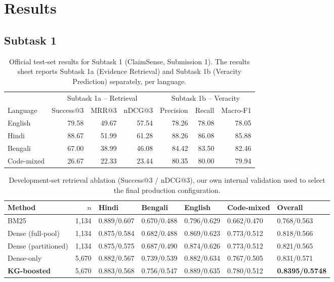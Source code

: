 \documentclass[
]{ceurart}
\begin{document}
\section{Results}

\subsection{Subtask 1}
\label{sec:results-st1}

\begin{table}[h]
  \centering
  \caption{Official test-set results for Subtask 1 (ClaimSense,
    Submission 1). The results sheet reports Subtask 1a (Evidence
    Retrieval) and Subtask 1b (Veracity Prediction) separately, per
    language.}
  \label{tab:st1-official}
  \small
  \begin{tabular}{@{}lrrrrrr@{}}
    \toprule
    & \multicolumn{3}{c}{Subtask 1a -- Retrieval} & \multicolumn{3}{c}{Subtask 1b -- Veracity} \\
    \cmidrule(lr){2-4} \cmidrule(lr){5-7}
    Language & Success@3 & MRR@3 & nDCG@3 & Precision & Recall & Macro-F1 \\
    \midrule
    English     & 79.58 & 49.67 & 57.54 & 78.26 & 78.08 & 78.05 \\
    Hindi       & 88.67 & 51.99 & 61.28 & 88.26 & 86.08 & 85.88 \\
    Bengali     & 67.00 & 38.99 & 46.08 & 84.42 & 83.50 & 82.46 \\
    Code-mixed  & 26.67 & 22.33 & 23.44 & 80.35 & 80.00 & 79.94 \\
    \bottomrule
  \end{tabular}
\end{table}

\begin{table}[h]
  \centering
  \caption{Development-set retrieval ablation (Success@3 / nDCG@3),
    our own internal validation used to select the final production
    configuration.}
  \label{tab:st1-ablation}
  \small
  \begin{tabular}{@{}lrlllll@{}}
    \toprule
    Method & $n$ & Hindi & Bengali & English & Code-mixed & Overall \\
    \midrule
    BM25 & 1{,}134 & 0.889/0.607 & 0.670/0.488 & 0.796/0.629 & 0.662/0.470 & 0.768/0.563 \\
    Dense (full-pool) & 1{,}134 & 0.875/0.584 & 0.682/0.488 & 0.869/0.623 & 0.773/0.512 & 0.818/0.566 \\
    Dense (partitioned) & 1{,}134 & 0.875/0.575 & 0.687/0.490 & 0.874/0.626 & 0.773/0.512 & 0.821/0.565 \\
    Dense-only & 5{,}670 & 0.882/0.567 & 0.739/0.539 & 0.882/0.634 & 0.767/0.505 & 0.831/0.571 \\
    \textbf{KG-boosted} & 5{,}670 & 0.883/0.568 & 0.756/0.547 & 0.889/0.635 & 0.780/0.512 & \textbf{0.8395/0.5748} \\
    \bottomrule
  \end{tabular}
\end{table}
\end{document}
